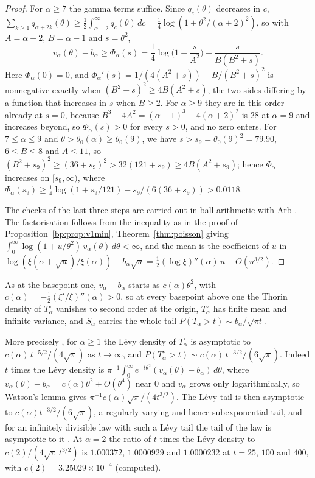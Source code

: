 \begin{proof}
For $\alpha\ge7$ the gamma terms suffice. Since $q_c(\theta)$ decreases in $c$, $\sum_{k\ge1}q_{\alpha+2k}(\theta)\ge\frac12\int_{\alpha+2}^\infty q_c(\theta)\,dc=\frac14\log(1+\theta^2/(\alpha+2)^2)$, so with $A=\alpha+2$, $B=\alpha-1$ and $s=\theta^2$,
\[
v_\alpha(\theta)-b_\alpha\ge\Phi_\alpha(s)=\frac14\log\Big(1+\frac s{A^2}\Big)-\frac s{B(B^2+s)} .
\]
Here $\Phi_\alpha(0)=0$, and $\Phi_\alpha'(s)=1/(4(A^2+s))-B/(B^2+s)^2$ is nonnegative exactly when $(B^2+s)^2\ge4B(A^2+s)$, the two sides differing by a function that increases in $s$ when $B\ge2$. For $\alpha\ge9$ they are in this order already at $s=0$, because $B^3-4A^2=(\alpha-1)^3-4(\alpha+2)^2$ is $28$ at $\alpha=9$ and increases beyond, so $\Phi_\alpha(s)>0$ for every $s>0$, and no zero enters. For $7\le\alpha\le9$ and $\theta>\theta_0(\alpha)\ge\theta_0(9)$, we have $s>s_9=\theta_0(9)^2=79.90$, $6\le B\le8$ and $A\le11$, so $(B^2+s_9)^2\ge(36+s_9)^2>32(121+s_9)\ge4B(A^2+s_9)$; hence $\Phi_\alpha$ increases on $[s_9,\infty)$, where $\Phi_\alpha(s_9)\ge\frac14\log(1+s_9/121)-s_9/(6(36+s_9))>0.0118$.

The checks of the last three steps are carried out in ball arithmetic with Arb \cite{Arb}. The factorisation follows from the inequality as in the proof of Proposition~\ref{bp:prop:v1min}, Theorem~\ref{thm:poisson} giving $\int_0^\infty\log(1+u/\theta^2)\,v_\alpha(\theta)\,d\theta<\infty$, and the mean is the coefficient of $u$ in $\log(\xi(\alpha+\sqrt u)/\xi(\alpha))-b_\alpha\sqrt u=\frac12(\log\xi)''(\alpha)\,u+O(u^{3/2})$.
\end{proof}

As at the basepoint one, $v_\alpha-b_\alpha$ starts as $c(\alpha)\theta^2$, with $c(\alpha)=-\frac12(\xi'/\xi)''(\alpha)>0$, so at every basepoint above one the Thorin density of $T_\alpha^\circ$ vanishes to second order at the origin, $T_\alpha^\circ$ has finite mean and infinite variance, and $S_\alpha$ carries the whole tail $P(T_\alpha>t)\sim b_\alpha/\sqrt{\pi t}$.

\begin{resultpar}\label{bp:res:tail}More precisely \cite{PolsonRXi26}, for $\alpha\ge1$ the L\'evy density of $T_\alpha^\circ$ is asymptotic to $c(\alpha)\,t^{-5/2}/(4\sqrt\pi)$ as $t\to\infty$, and $P(T_\alpha^\circ>t)\sim c(\alpha)\,t^{-3/2}/(6\sqrt\pi)$. Indeed $t$ times the L\'evy density is $\pi^{-1}\int_0^\infty e^{-t\theta^2}(v_\alpha(\theta)-b_\alpha)\,d\theta$, where $v_\alpha(\theta)-b_\alpha=c(\alpha)\theta^2+O(\theta^4)$ near $0$ and $v_\alpha$ grows only logarithmically, so Watson's lemma gives $\pi^{-1}c(\alpha)\sqrt\pi/(4t^{3/2})$. The L\'evy tail is then asymptotic to $c(\alpha)t^{-3/2}/(6\sqrt\pi)$, a regularly varying and hence subexponential tail, and for an infinitely divisible law with such a L\'evy tail the tail of the law is asymptotic to it \cite{EGV79}. At $\alpha=2$ the ratio of $t$ times the L\'evy density to $c(2)/(4\sqrt\pi\,t^{3/2})$ is $1.000372$, $1.0000929$ and $1.0000232$ at $t=25$, $100$ and $400$, with $c(2)=3.25029\times10^{-4}$ (computed).\end{resultpar}

